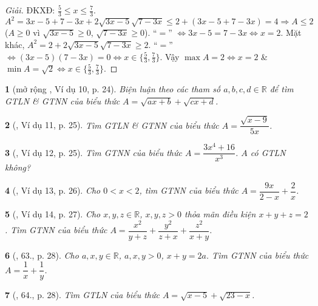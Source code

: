 \documentclass{article}
\newtheorem{baitoan}{}
\begin{document}
\begin{proof}[Giải]
	ĐKXĐ: $\frac{5}{3}\le x\le\frac{7}{3}$. $A^2 = 3x - 5 + 7 - 3x + 2\sqrt{3x - 5}\sqrt{7 - 3x}\le2 + (3x - 5 + 7 - 3x) = 4\Rightarrow A\le2$ ($A\ge0$ vì $\sqrt{3x - 5}\ge0$, $\sqrt{7 - 3x}\ge0$). ``$=$'' $\Leftrightarrow 3x - 5 = 7 - 3x\Leftrightarrow x = 2$. Mặt khác, $A^2 = 2 + 2\sqrt{3x - 5}\sqrt{7 - 3x}\ge2$. ``$=$'' $\Leftrightarrow(3x - 5)(7 - 3x) = 0\Leftrightarrow x\in\{\frac{5}{3},\frac{7}{3}\}$. Vậy $\max A = 2\Leftrightarrow x = 2$ \& $\min A = \sqrt{2}\Leftrightarrow x\in\{\frac{5}{3},\frac{7}{3}\}$.
\end{proof}

\begin{baitoan}[mở rộng \cite{Tuyen_Toan_9_old}, Ví dụ 10, p. 24]
	Biện luận theo các tham số $a,b,c,d\in\mathbb{R}$ để tìm {\rm GTLN} \& {\rm GTNN} của biểu thức $A = \sqrt{ax + b} + \sqrt{cx + d}$.
\end{baitoan}

\begin{baitoan}[\cite{Tuyen_Toan_9_old}, Ví dụ 11, p. 25]
	Tìm {\rm GTLN} \& {\rm GTNN} của biểu thức $A = \dfrac{\sqrt{x - 9}}{5x}$.
\end{baitoan}

\begin{baitoan}[\cite{Tuyen_Toan_9_old}, Ví dụ 12, p. 25]
	Tìm {\rm GTNN} của biểu thức $A = \dfrac{3x^4 + 16}{x^3}$. $A$ có {\rm GTLN} không?
\end{baitoan}

\begin{baitoan}[\cite{Tuyen_Toan_9_old}, Ví dụ 13, p. 26]
	Cho $0 < x < 2$, tìm {\rm GTNN} của biểu thức $A = \dfrac{9x}{2 - x} + \dfrac{2}{x}$. 
\end{baitoan}

\begin{baitoan}[\cite{Tuyen_Toan_9_old}, Ví dụ 14, p. 27]
	Cho $x,y,z\in\mathbb{R}$, $x,y,z > 0$ thỏa mãn điều kiện $x + y + z = 2$. Tìm {\rm GTNN} của biểu thức $A = \dfrac{x^2}{y + z} + \dfrac{y^2}{z + x} + \dfrac{z^2}{x + y}$.
\end{baitoan}

\begin{baitoan}[\cite{Tuyen_Toan_9_old}, 63., p. 28]
	Cho $a,x,y\in\mathbb{R}$, $a,x,y > 0$, $x + y = 2a$. Tìm {\rm GTNN} của biểu thức $A = \dfrac{1}{x} + \dfrac{1}{y}$.
\end{baitoan}

\begin{baitoan}[\cite{Tuyen_Toan_9_old}, 64., p. 28]
	Tìm {\rm GTLN} của biểu thức $A = \sqrt{x - 5} + \sqrt{23 - x}$.
\end{baitoan}
\end{document}
